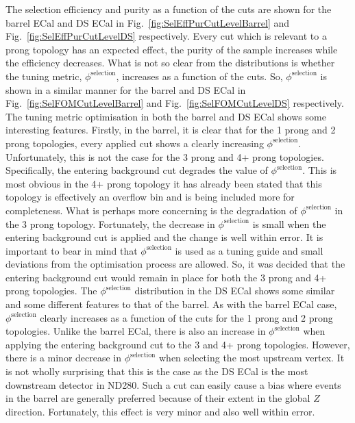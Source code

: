 The selection efficiency and purity as a function of the cuts are shown for the barrel ECal and DS ECal in Fig.~\ref{fig:SelEffPurCutLevelBarrel} and Fig.~\ref{fig:SelEffPurCutLevelDS} respectively.  Every cut which is relevant to a prong topology has an expected effect, the purity of the sample increases while the efficiency decreases.  What is not so clear from the distributions is whether the tuning metric, $\phi^{\textrm{selection}}$, increases as a function of the cuts.  So, $\phi^{\textrm{selection}}$ is shown in a similar manner for the barrel and DS ECal in Fig.~\ref{fig:SelFOMCutLevelBarrel} and Fig.~\ref{fig:SelFOMCutLevelDS} respectively.  The tuning metric optimisation in both the barrel and DS ECal shows some interesting features.  Firstly, in the barrel, it is clear that for the 1 prong and 2 prong topologies, every applied cut shows a clearly increasing $\phi^{\textrm{selection}}$.  Unfortunately, this is not the case for the 3 prong and 4+ prong topologies.  Specifically, the entering background cut degrades the value of $\phi^{\textrm{selection}}$.  This is most obvious in the 4+ prong topology it has already been stated that this topology is effectively an overflow bin and is being included more for completeness.  What is perhaps more concerning is the degradation of $\phi^{\textrm{selection}}$ in the 3 prong topology.  Fortunately, the decrease in $\phi^{\textrm{selection}}$ is small when the entering background cut is applied and the change is well within error.  It is important to bear in mind that $\phi^{\textrm{selection}}$ is used as a tuning guide and small deviations from the optimisation process are allowed.  So, it was decided that the entering background cut would remain in place for both the 3 prong and 4+ prong topologies.  The $\phi^{\textrm{selection}}$ distribution in the DS ECal shows some similar and some different features to that of the barrel.  As with the barrel ECal case, $\phi^{\textrm{selection}}$ clearly increases as a function of the cuts for the 1 prong and 2 prong topologies.  Unlike the barrel ECal, there is also an increase in $\phi^{\textrm{selection}}$ when applying the entering background cut to the 3 and 4+ prong topologies.  However, there is a minor decrease in $\phi^{\textrm{selection}}$ when selecting the most upstream vertex.  It is not wholly surprising that this is the case as the DS ECal is the most downstream detector in ND280.  Such a cut can easily cause a bias where events in the barrel are generally preferred because of their extent in the global $Z$ direction.  Fortunately, this effect is very minor and also well within error.  
